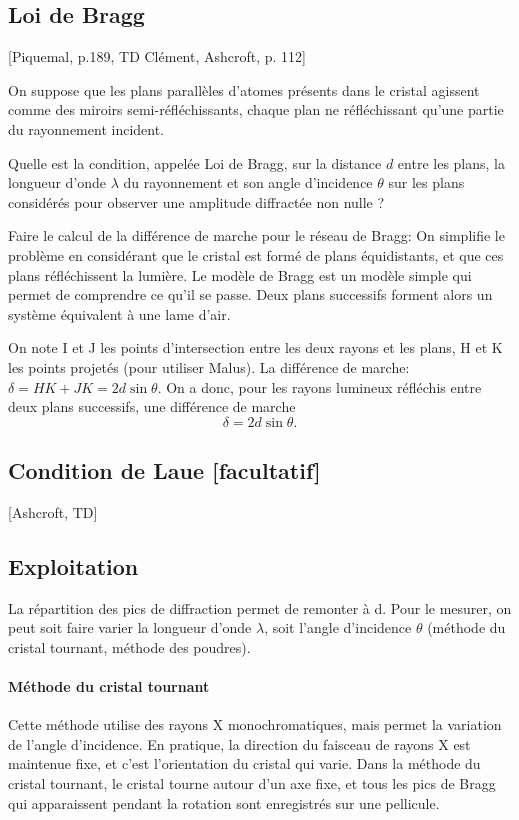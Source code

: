 \documentclass[11pt]{report}
\numberwithin{figure}{section}
\numberwithin{equation}{section}
\numberwithin{table}{section}
\newcommand{\1}{\boldsymbol{1}}
\begin{document}
\subsection{Loi de Bragg}

[Piquemal, p.189, TD Clément, Ashcroft, p. 112]

On suppose que les plans parallèles d'atomes présents dans le cristal agissent
comme des miroirs semi-réfléchissants, chaque plan ne réfléchissant qu'une partie du rayonnement incident.

Quelle est la condition, appelée Loi de Bragg, sur la distance
$d$ entre les plans, la longueur d'onde $\lambda$ du rayonnement et son angle d'incidence $\theta$ sur
les plans considérés pour observer une amplitude diffractée non nulle ?

Faire le calcul de la différence de marche pour le réseau de Bragg: On simplifie le problème en considérant que le cristal est formé de plans équidistants, et que ces plans réfléchissent la lumière. Le modèle de Bragg est un modèle simple qui permet de comprendre ce qu'il se passe. Deux plans successifs forment alors un système équivalent à une lame d'air. 

On note I et J les points d'intersection entre les deux rayons et les plans, H et K les points projetés (pour utiliser Malus). La différence de marche: $\delta = HK + JK = 2d \sin \theta$. On a donc, pour les rayons lumineux réfléchis entre deux plans successifs, une différence de marche 
\begin{equation}
\delta = 2 d \sin \theta.
\end{equation}



\subsection{Condition de Laue [facultatif]}

[Ashcroft, TD]

\subsection{Exploitation}

La répartition des pics de diffraction permet de remonter à d. Pour le mesurer,
on peut soit faire varier la longueur d'onde $\lambda$, soit l'angle d'incidence $\theta$ (méthode du cristal tournant, méthode des poudres).

\paragraph{Méthode du cristal tournant} Cette méthode utilise des rayons X
monochromatiques, mais permet la variation de l'angle d'incidence. En pratique, la direction du faisceau de rayons X est maintenue fixe, et c'est l'orientation du cristal qui varie. Dans la méthode du cristal tournant, le cristal tourne autour d'un axe fixe, et tous les pics de Bragg qui apparaissent pendant la rotation sont enregistrés sur une pellicule.
\end{document}
